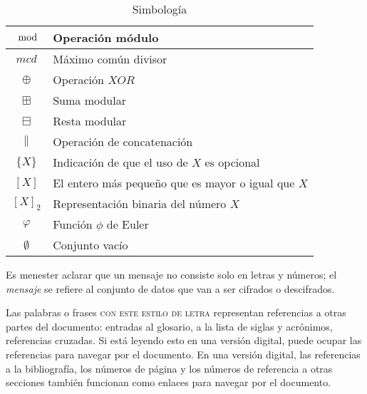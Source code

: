 \begin{table}[H]
\begin{center}
\begin{tabular}{c|l}
      \hline
      $\mod$ & Operación módulo \\
      \hline
      $mcd$ & Máximo común divisor \\
      \hline
      $\oplus$ & Operación $XOR$ \\
      \hline
      $\boxplus$ & Suma modular \\
      \hline
      $\boxminus$ & Resta modular \\
      \hline
      $\parallel$ & Operación de concatenación \\
      \hline
      $\{X\}$ & Indicación de que el uso de $X$ es opcional \\
      \hline
      $[X]$ & El entero más pequeño que es mayor o igual que $X$ \\
      \hline
      $[X]_2$ & Representación binaria del número $X$ \\
      \hline
      $\varphi$ & Función $\phi$ de Euler \\
      \hline
      $\emptyset$ & Conjunto vacío \\
      \hline
    \end{tabular}
    \caption{Simbología}\label{tab:simb}
  \end{center}
\end{table}

Es menester aclarar que un mensaje no consiste solo en letras y números;
el \textit{mensaje} se refiere al conjunto de datos que van a ser
cifrados o descifrados.

Las palabras o frases \textsc{con este estilo de letra} representan
referencias a otras partes del documento: entradas al glosario, a la lista de
siglas y acrónimos, referencias cruzadas. Si está leyendo esto en una
versión digital, puede ocupar las referencias para navegar por el documento.
En una versión digital, las referencias a la bibliografía, los números de
página y los números de referencia a otras secciones también funcionan
como enlaces para navegar por el documento.
